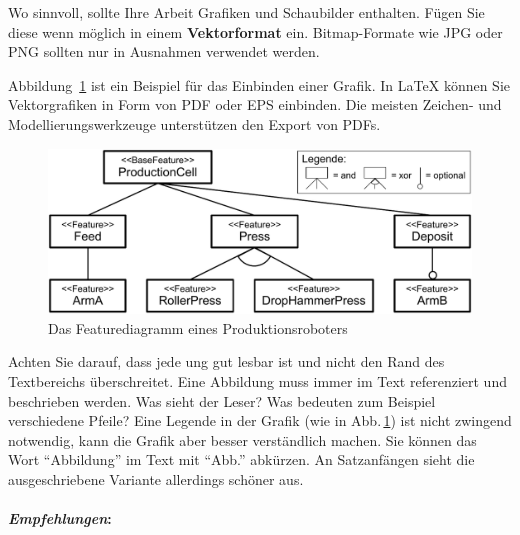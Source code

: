 Wo sinnvoll, sollte Ihre Arbeit Grafiken und Schaubilder enthalten. Fügen Sie diese wenn möglich in einem \textbf{Vektorformat} ein. Bitmap-Formate wie JPG oder PNG sollten nur in Ausnahmen verwendet werden.

Abbildung~\ref{fig:feature-diagram-productioncell-example} ist ein Beispiel für das Einbinden einer Grafik. In \LaTeX{} können Sie Vektorgrafiken in Form von PDF oder EPS einbinden. Die meisten Zeichen- und Modellierungswerkzeuge unterstützen den Export von PDFs.

\begin{figure}[h]
 \centering
 \includegraphics[scale=\stdScaleFactor]
 {contents/figures/feature-diagram-productioncell-example.pdf}
 \caption{Das Featurediagramm eines Produktionsroboters}
 \label{fig:feature-diagram-productioncell-example}
\end{figure}

Achten Sie darauf, dass jede ung gut lesbar ist und nicht den Rand des Textbereichs überschreitet. Eine Abbildung muss immer im Text referenziert und beschrieben werden. Was sieht der Leser? Was bedeuten zum Beispiel verschiedene Pfeile? Eine Legende in der Grafik (wie in Abb.\,\ref{fig:feature-diagram-productioncell-example}) ist nicht zwingend notwendig, kann die Grafik aber besser verständlich machen. Sie können das Wort "`Abbildung"' im Text mit "`Abb."' abkürzen. An Satzanfängen sieht die ausgeschriebene Variante allerdings schöner aus.

\paragraph{\textit{Empfehlungen}:}


